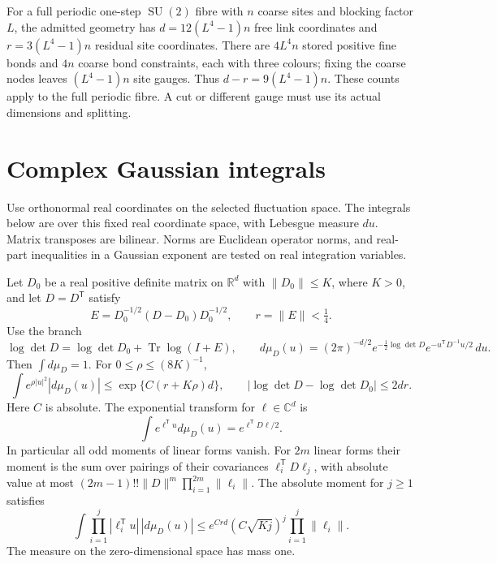 \documentclass[11pt,letterpaper,reqno]{amsart}
\makeatletter
\numberwithin{equation}{section}
\theoremstyle{definition}
\newcommand{\ms@majorstart}{%
  \pushQED{\qed}\renewcommand{\qedsymbol}{$\blacksquare\square$}}
\newenvironment{theorem}[1][]{\ms@majorstart\ms@theorem[#1]}
  {\popQED\endms@theorem}
\theoremstyle{remark}
\makeatother
\begin{document}
For a full periodic one-step $\operatorname{SU}(2)$ fibre with
$n$ coarse sites and blocking factor $L$, the admitted geometry
has $d=12(L^4-1)n$ free link coordinates and
$r=3(L^4-1)n$ residual site coordinates. There are $4L^4n$
stored positive fine bonds and $4n$ coarse bond constraints,
each with three colours; fixing the coarse nodes leaves
$(L^4-1)n$ site gauges. Thus $d-r=9(L^4-1)n$.
These counts apply to the full periodic fibre. A cut or
different gauge must use its actual dimensions and splitting.

\section{Complex Gaussian integrals}
\label{gi:sec-complex-gaussian}

Use orthonormal real coordinates on the selected fluctuation space. The
integrals below are over this fixed real coordinate space, with Lebesgue
measure \(du\). Matrix transposes are bilinear. Norms are Euclidean
operator norms, and real-part inequalities in a Gaussian exponent are
tested on real integration variables.

\begin{theorem}[The relative covariance sector]
\label{gi:thm-complex-sector}
Let \(D_0\) be a real positive definite matrix on \(\mathbb R^d\) with
\(\|D_0\|\le K\), where \(K>0\), and let \(D=D^{\mathsf T}\) satisfy
\[
 E=D_0^{-1/2}(D-D_0)D_0^{-1/2},\qquad r=\|E\|<\tfrac14 .
\]
Use the branch
\begin{equation}\label{gi:eq-complex-density}
 \log\det D=\log\det D_0+\operatorname{Tr}\log(I+E),\qquad
 d\mu_D(u)=(2\pi)^{-d/2}e^{-\frac12\log\det D}
                         e^{-u^{\mathsf T}D^{-1}u/2}\,du .
\end{equation}
Then \(\int d\mu_D=1\). For \(0\le\rho\le (8K)^{-1}\),
\begin{equation}\label{gi:eq-complex-growth}
 \int e^{\rho|u|^2}|d\mu_D(u)|
                 \le \exp\{C(r+K\rho)d\},
 \qquad
 |\log\det D-\log\det D_0|\le 2dr .
\end{equation}
Here \(C\) is absolute. The exponential transform for
\(\ell\in\mathbb C^d\) is
\begin{equation}\label{gi:eq-complex-exponential}
 \int e^{\ell^{\mathsf T}u}d\mu_D(u)
                         =e^{\ell^{\mathsf T}D\ell/2}.
\end{equation}
In particular all odd moments of linear forms vanish. For \(2m\) linear
forms their moment is the sum over pairings of their covariances
\(\ell_i^{\mathsf T}D\ell_j\), with absolute value at most
\((2m-1)!!\|D\|^m\prod_{i=1}^{2m}\|\ell_i\|\).
The absolute moment for \(j\ge1\) satisfies
\begin{equation}\label{gi:eq-complex-absolute-moment}
 \int \prod_{i=1}^j|\ell_i^{\mathsf T}u|\,|d\mu_D(u)|
       \le e^{Crd}(C\sqrt{Kj})^j\prod_{i=1}^j\|\ell_i\|.
\end{equation}
The measure on the zero-dimensional space has mass one.
\end{theorem}
\end{document}
